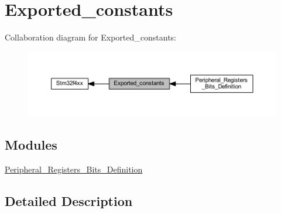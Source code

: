 \hypertarget{group___exported__constants}{}\section{Exported\+\_\+constants}
\label{group___exported__constants}
Collaboration diagram for Exported\+\_\+constants\+:\nopagebreak
\begin{figure}[H]
\begin{center}
\leavevmode
\includegraphics[width=350pt]{group___exported__constants}
\end{center}
\end{figure}
\subsection*{Modules}
\begin{DoxyCompactItemize}
\item 
\hyperlink{group___peripheral___registers___bits___definition}{Peripheral\+\_\+\+Registers\+\_\+\+Bits\+\_\+\+Definition}
\end{DoxyCompactItemize}


\subsection{Detailed Description}
